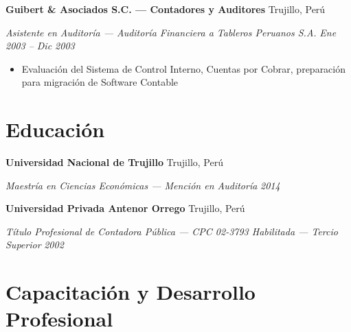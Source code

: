 \documentclass[10pt,letterpaper]{article}
\newcommand{\entry}[4]{%
  \noindent\textbf{#1} \hfill #2 \par\nopagebreak
  \textit{#3} \hfill \textit{#4} \par\nopagebreak
}
\begin{document}
\entry{Guibert \& Asociados S.C. — Contadores y Auditores}{Trujillo, Perú}{Asistente en Auditoría — Auditoría Financiera a Tableros Peruanos S.A.}{Ene 2003 -- Dic 2003}
\begin{itemize}
  \item Evaluación del Sistema de Control Interno, Cuentas por Cobrar, preparación para migración de Software Contable
\end{itemize}
\vspace{0.2em}

\section{Educación}

\entry{Universidad Nacional de Trujillo}{Trujillo, Perú}{Maestría en Ciencias Económicas — Mención en Auditoría}{2014}
\vspace{0.2em}

\entry{Universidad Privada Antenor Orrego}{Trujillo, Perú}{Título Profesional de Contadora Pública — CPC 02-3793 Habilitada — Tercio Superior}{2002}
\vspace{0.2em}

\section{Capacitación y Desarrollo Profesional}
\end{document}
